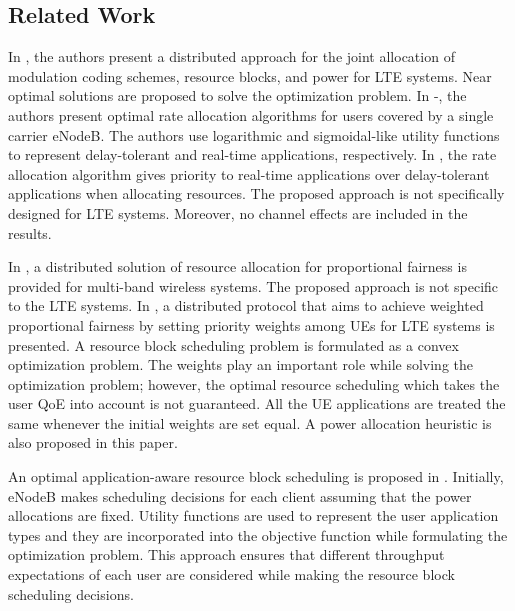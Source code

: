 \documentclass[journal]{IEEEtran} 				\IEEEoverridecommandlockouts 	\usepackage{amsmath,amssymb}
\begin{document}
\subsection{Related Work}\label{sec:relatedwork}
In \cite{Perez}, the authors present a distributed approach for the joint allocation of modulation coding schemes, resource blocks, and power for LTE systems. Near optimal solutions are proposed to solve the optimization problem. In \cite{Ahmed_Utility1}-\cite{Ahmed_Utility3}, the authors present optimal rate allocation algorithms for users covered by a single carrier eNodeB. The authors use logarithmic and sigmoidal-like utility functions to represent delay-tolerant and real-time applications, respectively. In \cite{Ahmed_Utility1}, the rate allocation algorithm gives priority to real-time applications over delay-tolerant applications when allocating resources. The proposed approach is not specifically designed for LTE systems. Moreover, no channel effects are included in the results. 

In \cite{MultiBand}, a distributed solution of resource allocation for proportional fairness is provided for multi-band wireless systems. The proposed approach is not specific to the LTE systems. In \cite{SelfOrganizedLTE}, a distributed protocol that aims to achieve weighted proportional fairness by setting priority weights among UEs for LTE systems is presented. A resource block scheduling problem is formulated as a convex optimization problem. The weights play an important role while solving the optimization problem; however, the optimal resource scheduling which takes the user QoE into account is not guaranteed. All the UE applications are treated the same whenever the initial weights are set equal. A power allocation heuristic is also proposed in this paper. 

An optimal application-aware resource block scheduling is proposed in \cite{Erpek}. Initially, eNodeB makes scheduling decisions for each client assuming that the power allocations are fixed. Utility functions are used to represent the user application types and they are incorporated into the objective function while formulating the optimization problem. This approach ensures that different throughput expectations of each user are considered while making the resource block scheduling decisions.  
 
\end{document}
